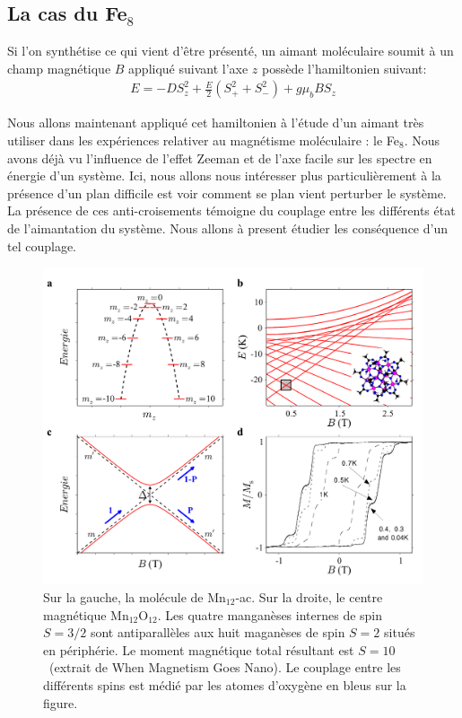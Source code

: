 \subsection{La cas du Fe$_8$}
Si l'on synthétise ce qui vient d'\^etre présenté, un aimant moléculaire soumit à un champ magnétique $B$ appliqué suivant l'axe $z$ possède l'hamiltonien suivant:
\begin{eqnarray}
E =  -DS_z^2 + \frac{E}{2} ( S_+^2  + S_-^2) + g\mu_b B S_z 
\end{eqnarray}


Nous allons maintenant appliqué cet hamiltonien à l'étude d'un aimant très utiliser dans les expériences relativer au magnétisme moléculaire : le Fe$_8$. Nous avons déjà vu l'influence de l'effet Zeeman et de l'axe facile sur les spectre en énergie d'un système. Ici, nous allons nous intéresser plus particulièrement à la présence d'un plan difficile est voir comment se plan vient perturber le système. La présence de ces anti-croisements témoigne du couplage entre les différents état de l'aimantation du système. Nous allons à present étudier les conséquence d'un tel couplage.

\begin{figure}
\centering \includegraphics[scale=0.5]{Theorie/MagMol/figure3/figure3.pdf} 
\caption{Sur la gauche, la molécule de Mn$_{12}$-ac. Sur la droite, le centre magnétique Mn$_{12}$O$_{12}$. Les quatre manganèses internes de spin $S=3/2$ sont antiparallèles aux huit maganèses de spin $S=2$ situés en périphérie. Le moment magnétique total résultant est $S=10$~(extrait de When Magnetism Goes Nano). Le couplage entre les différents spins est médié par les atomes d'oxygène en bleus sur la figure.}
\label{Fe8Zeeman}
\end{figure}

